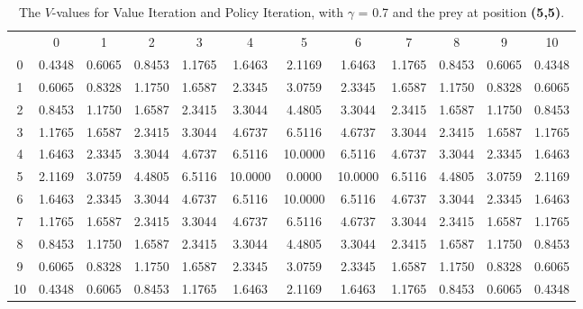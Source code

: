 \documentclass{article}
\begin{document}
\subsection*{}
\begin{table}[htb]
\centering
\begin{footnotesize}
\begin{tabular} {c c c c c c c c c c c c}
 & 0 & 1 & 2 & 3 & 4 & 5 & 6 & 7 & 8 & 9 & 10 \\
0 &  0.4348 &  0.6065 &  0.8453 &  1.1765 &  1.6463 &  2.1169 &  1.6463 &  1.1765 &  0.8453 &  0.6065 &  0.4348\\
1 &  0.6065 &  0.8328 &  1.1750 &  1.6587 &  2.3345 &  3.0759 &  2.3345 &  1.6587 &  1.1750 &  0.8328 &  0.6065\\
2 &  0.8453 &  1.1750 &  1.6587 &  2.3415 &  3.3044 &  4.4805 &  3.3044 &  2.3415 &  1.6587 &  1.1750 &  0.8453\\
3 &  1.1765 &  1.6587 &  2.3415 &  3.3044 &  4.6737 &  6.5116 &  4.6737 &  3.3044 &  2.3415 &  1.6587 &  1.1765\\
4 &  1.6463 &  2.3345 &  3.3044 &  4.6737 &  6.5116 & 10.0000 &  6.5116 &  4.6737 &  3.3044 &  2.3345 &  1.6463\\
5 &  2.1169 &  3.0759 &  4.4805 &  6.5116 & 10.0000 &  0.0000 & 10.0000 &  6.5116 &  4.4805 &  3.0759 &  2.1169\\
6 &  1.6463 &  2.3345 &  3.3044 &  4.6737 &  6.5116 & 10.0000 &  6.5116 &  4.6737 &  3.3044 &  2.3345 &  1.6463\\
7 &  1.1765 &  1.6587 &  2.3415 &  3.3044 &  4.6737 &  6.5116 &  4.6737 &  3.3044 &  2.3415 &  1.6587 &  1.1765\\
8 &  0.8453 &  1.1750 &  1.6587 &  2.3415 &  3.3044 &  4.4805 &  3.3044 &  2.3415 &  1.6587 &  1.1750 &  0.8453\\
9 &  0.6065 &  0.8328 &  1.1750 &  1.6587 &  2.3345 &  3.0759 &  2.3345 &  1.6587 &  1.1750 &  0.8328 &  0.6065\\
10 &  0.4348 &  0.6065 &  0.8453 &  1.1765 &  1.6463 &  2.1169 &  1.6463 &  1.1765 &  0.8453 &  0.6065 &  0.4348\\
\end{tabular}\\
\end{footnotesize}
\caption{The $V$-values for Value Iteration and Policy Iteration, with $\gamma$ = 0.7 and the prey at position \textbf{(5,5)}. }
\label{valueiteration3}
\end{table}
\end{document}
